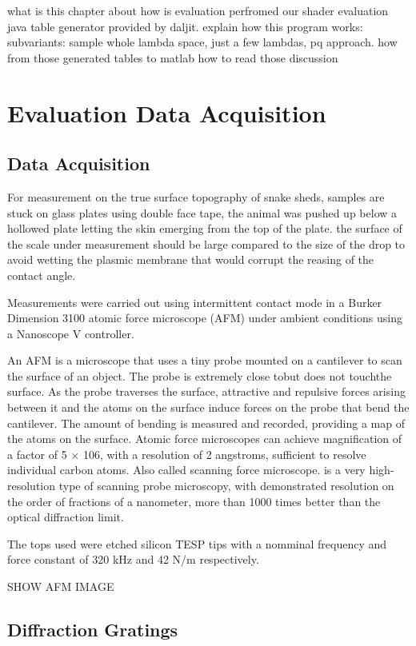 what is this chapter about
how is evaluation perfromed
our shader
evaluation java table generator provided by daljit.
explain how this program works:
subvariants: sample whole lambda space, just a few lambdas, pq approach.
how from those generated tables to matlab
how to read those
discussion


\section{Evaluation Data Acquisition}
\subsection{Data Acquisition}
For measurement on the true surface topography of snake sheds, samples are stuck on glass plates using double face tape, the animal was pushed up below a hollowed plate letting the skin emerging from the top of the plate. the surface of the scale under measurement should be large compared to the size of the drop to avoid wetting the plasmic membrane that would corrupt the reasing of the contact angle. 

Measurements were carried out using intermittent contact mode in a Burker Dimension 3100 atomic force microscope (AFM) under ambient conditions using a Nanoscope V controller. 

An AFM is a microscope that uses a tiny probe mounted on a cantilever to scan the surface of an object. The probe is extremely close tobut does not touchthe surface. As the probe traverses the surface, attractive and repulsive forces arising between it and the atoms on the surface induce forces on the probe that bend the cantilever. The amount of bending is measured and recorded, providing a map of the atoms on the surface. Atomic force microscopes can achieve magnification of a factor of 5 × 106, with a resolution of 2 angstroms, sufficient to resolve individual carbon atoms. Also called scanning force microscope.
is a very high-resolution type of scanning probe microscopy, with demonstrated resolution on the order of fractions of a nanometer, more than 1000 times better than the optical diffraction limit.

The tops used were etched silicon TESP tips with a nomminal frequency and force constant of 320 kHz and 42 N/m respectively. 

SHOW AFM IMAGE

\subsection{Diffraction Gratings}

